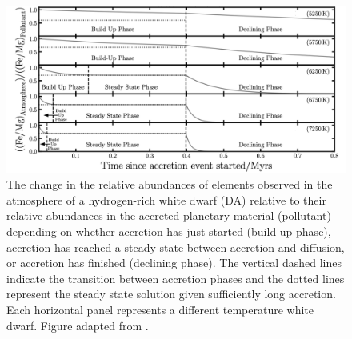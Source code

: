 \documentclass[onecolumn,authoryear]{els-mrw}
\newcommand\eg{{\it e.g.} }
\begin{document}






\begin{figure}[t]
\centering
\includegraphics[width=.9\textwidth]{relative_sinking_harrison.png}
\caption{The change in the relative abundances of elements observed in the atmosphere of a hydrogen-rich white dwarf (DA) relative to their relative abundances in the accreted planetary material (pollutant) depending on whether accretion has just started (build-up phase), accretion has reached a steady-state between accretion and diffusion, or accretion has finished (declining phase). The vertical dashed lines indicate the transition between accretion phases and the dotted lines represent the steady state solution given sufficiently long accretion. Each horizontal panel represents a different temperature white dwarf. Figure adapted from \citet{harrison_thesis}.}
\label{fig:sinking}
\end{figure}
  
\end{document}
